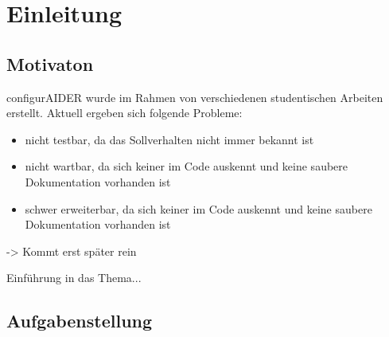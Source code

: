 \chapter{Einleitung}

\section{Motivaton}

\textcolor[rgb]{1,0,0}{configurAIDER wurde im Rahmen von verschiedenen studentischen Arbeiten erstellt. Aktuell ergeben sich folgende Probleme:
\begin{itemize}
	\item nicht testbar, da das Sollverhalten nicht immer bekannt ist
	\item nicht wartbar, da sich keiner im Code auskennt und keine saubere Dokumentation vorhanden ist
	\item schwer erweiterbar, da sich keiner im Code auskennt und keine saubere Dokumentation vorhanden ist
\end{itemize}
}
-> Kommt erst später rein

Einführung in das Thema...


\section{Aufgabenstellung}	

